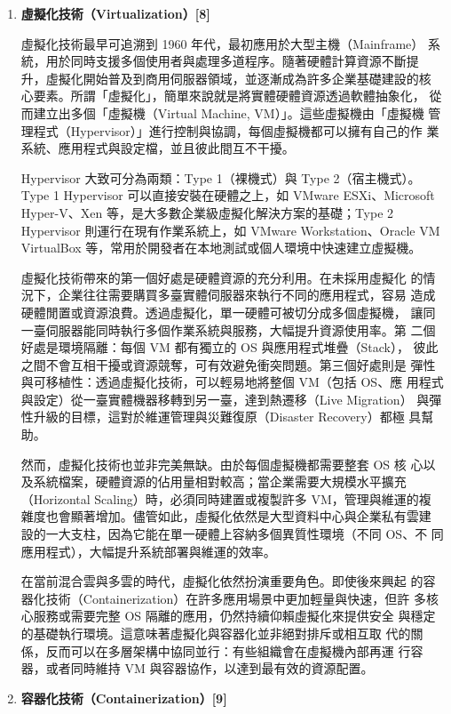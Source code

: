 \documentclass[12pt,a4paper]{article}
\begin{document}
\begin{enumerate}[label={(\zhdig*)}, leftmargin=2\parindent, listparindent=\parindent]
\begin{enumerate}[label={(\arabic*)}, leftmargin=\parindent, listparindent=\parindent]
\item\textbf{虛擬化技術（Virtualization）[8]}

    虛擬化技術最早可追溯到 1960 年代，最初應用於大型主機（Mainframe）
    系統，用於同時支援多個使用者與處理多道程序。隨著硬體計算資源不斷提
    升，虛擬化開始普及到商用伺服器領域，並逐漸成為許多企業基礎建設的核
    心要素。所謂「虛擬化」，簡單來說就是將實體硬體資源透過軟體抽象化，
    從而建立出多個「虛擬機（Virtual Machine, VM）」。這些虛擬機由「虛擬機
    管理程式（Hypervisor）」進行控制與協調，每個虛擬機都可以擁有自己的作
    業系統、應用程式與設定檔，並且彼此間互不干擾。

    Hypervisor 大致可分為兩類：Type 1（裸機式）與 Type 2（宿主機式）。
    Type 1 Hypervisor 可以直接安裝在硬體之上，如 VMware ESXi、Microsoft
    Hyper-V、Xen 等，是大多數企業級虛擬化解決方案的基礎；Type 2
    Hypervisor 則運行在現有作業系統上，如 VMware Workstation、Oracle VM
    VirtualBox 等，常用於開發者在本地測試或個人環境中快速建立虛擬機。

    虛擬化技術帶來的第一個好處是硬體資源的充分利用。在未採用虛擬化
    的情況下，企業往往需要購買多臺實體伺服器來執行不同的應用程式，容易
    造成硬體閒置或資源浪費。透過虛擬化，單一硬體可被切分成多個虛擬機，
    讓同一臺伺服器能同時執行多個作業系統與服務，大幅提升資源使用率。第
    二個好處是環境隔離：每個 VM 都有獨立的 OS 與應用程式堆疊（Stack），
    彼此之間不會互相干擾或資源競奪，可有效避免衝突問題。第三個好處則是
    彈性與可移植性：透過虛擬化技術，可以輕易地將整個 VM（包括 OS、應
    用程式與設定）從一臺實體機器移轉到另一臺，達到熱遷移（Live Migration）
    與彈性升級的目標，這對於維運管理與災難復原（Disaster Recovery）都極
    具幫助。

    然而，虛擬化技術也並非完美無缺。由於每個虛擬機都需要整套 OS 核
    心以及系統檔案，硬體資源的佔用量相對較高；當企業需要大規模水平擴充
    （Horizontal Scaling）時，必須同時建置或複製許多 VM，管理與維運的複
    雜度也會顯著增加。儘管如此，虛擬化依然是大型資料中心與企業私有雲建
    設的一大支柱，因為它能在單一硬體上容納多個異質性環境（不同 OS、不
    同應用程式），大幅提升系統部署與維運的效率。

    在當前混合雲與多雲的時代，虛擬化依然扮演重要角色。即使後來興起
    的容器化技術（Containerization）在許多應用場景中更加輕量與快速，但許
    多核心服務或需要完整 OS 隔離的應用，仍然持續仰賴虛擬化來提供安全
    與穩定的基礎執行環境。這意味著虛擬化與容器化並非絕對排斥或相互取
    代的關係，反而可以在多層架構中協同並行：有些組織會在虛擬機內部再運
    行容器，或者同時維持 VM 與容器協作，以達到最有效的資源配置。
\item\textbf{
容器化技術（Containerization）[9]
}


\end{enumerate}
\end{enumerate}
\end{document}
